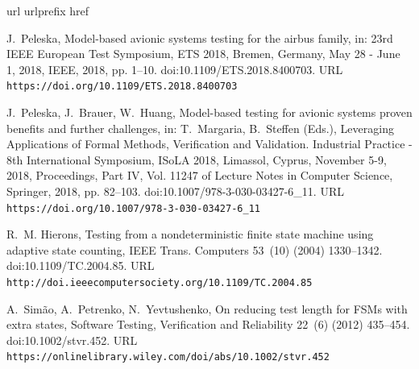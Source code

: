 \documentclass[3p,times]{elsarticle}
\begin{document}


\begin{thebibliography}{10}
\expandafter\ifx\csname url\endcsname\relax
  \def\url#1{\texttt{#1}}\fi
\expandafter\ifx\csname urlprefix\endcsname\relax\def\urlprefix{URL }\fi
\expandafter\ifx\csname href\endcsname\relax
  \def\href#1#2{#2} \def\path#1{#1}\fi

J.~Peleska, \href{https://doi.org/10.1109/ETS.2018.8400703}{Model-based avionic
  systems testing for the airbus family}, in: 23rd {IEEE} European Test
  Symposium, {ETS} 2018, Bremen, Germany, May 28 - June 1, 2018, {IEEE}, 2018,
  pp. 1--10.
\newblock \href {http://dx.doi.org/10.1109/ETS.2018.8400703}
  {\path{doi:10.1109/ETS.2018.8400703}}.
\newline\urlprefix\url{https://doi.org/10.1109/ETS.2018.8400703}

J.~Peleska, J.~Brauer, W.~Huang,
  \href{https://doi.org/10.1007/978-3-030-03427-6\_11}{Model-based testing for
  avionic systems proven benefits and further challenges}, in: T.~Margaria,
  B.~Steffen (Eds.), Leveraging Applications of Formal Methods, Verification
  and Validation. Industrial Practice - 8th International Symposium, ISoLA
  2018, Limassol, Cyprus, November 5-9, 2018, Proceedings, Part {IV}, Vol.
  11247 of Lecture Notes in Computer Science, Springer, 2018, pp. 82--103.
\newblock \href {http://dx.doi.org/10.1007/978-3-030-03427-6\_11}
  {\path{doi:10.1007/978-3-030-03427-6\_11}}.
\newline\urlprefix\url{https://doi.org/10.1007/978-3-030-03427-6\_11}

R.~M. Hierons,
  \href{http://doi.ieeecomputersociety.org/10.1109/TC.2004.85}{Testing from a
  nondeterministic finite state machine using adaptive state counting}, {IEEE}
  Trans. Computers 53~(10) (2004) 1330--1342.
\newblock \href {http://dx.doi.org/10.1109/TC.2004.85}
  {\path{doi:10.1109/TC.2004.85}}.
\newline\urlprefix\url{http://doi.ieeecomputersociety.org/10.1109/TC.2004.85}

A.~Simão, A.~Petrenko, N.~Yevtushenko,
  \href{https://onlinelibrary.wiley.com/doi/abs/10.1002/stvr.452}{On reducing
  test length for {FSMs} with extra states}, Software Testing, Verification and
  Reliability 22~(6) (2012) 435--454.
\newblock \href {http://dx.doi.org/10.1002/stvr.452}
  {\path{doi:10.1002/stvr.452}}.
\newline\urlprefix\url{https://onlinelibrary.wiley.com/doi/abs/10.1002/stvr.452}


\end{thebibliography}
\end{document}
